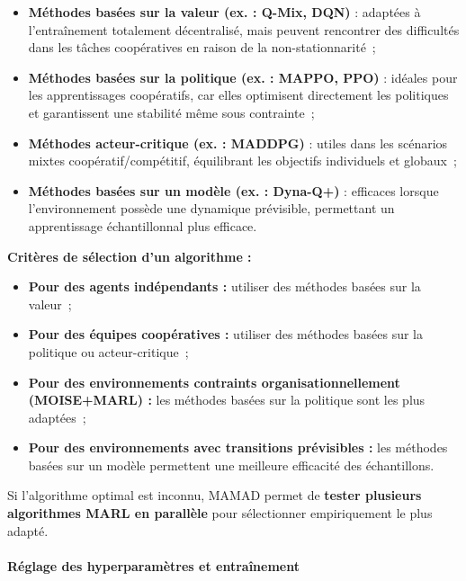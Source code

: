 \begin{itemize}
    \item \textbf{Méthodes basées sur la valeur (ex. : Q-Mix, DQN)} : adaptées à l'entraînement totalement décentralisé, mais peuvent rencontrer des difficultés dans les tâches coopératives en raison de la non-stationnarité~;

    \item \textbf{Méthodes basées sur la politique (ex. : MAPPO, PPO)} : idéales pour les apprentissages coopératifs, car elles optimisent directement les politiques et garantissent une stabilité même sous contrainte~;

    \item \textbf{Méthodes acteur-critique (ex. : MADDPG)} : utiles dans les scénarios mixtes coopératif/compétitif, équilibrant les objectifs individuels et globaux~;

    \item \textbf{Méthodes basées sur un modèle (ex. : Dyna-Q+)} : efficaces lorsque l'environnement possède une dynamique prévisible, permettant un apprentissage échantillonnal plus efficace.
\end{itemize}

\vspace{0.4em}
\noindent \textbf{Critères de sélection d'un algorithme :}
\begin{itemize}
    \item \textbf{Pour des agents indépendants :} utiliser des méthodes basées sur la valeur~;
    \item \textbf{Pour des équipes coopératives :} utiliser des méthodes basées sur la politique ou acteur-critique~;
    \item \textbf{Pour des environnements contraints organisationnellement (MOISE+MARL) :} les méthodes basées sur la politique sont les plus adaptées~;
    \item \textbf{Pour des environnements avec transitions prévisibles :} les méthodes basées sur un modèle permettent une meilleure efficacité des échantillons.
\end{itemize}

\vspace{0.4em}
\noindent Si l'algorithme optimal est inconnu, MAMAD permet de \textbf{tester plusieurs algorithmes MARL en parallèle} pour sélectionner empiriquement le plus adapté.

\paragraph{Réglage des hyperparamètres et entraînement}

